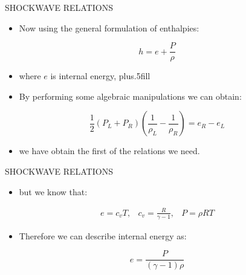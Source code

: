 \documentclass{beamer}
\begin{document}
\begin{frame}{SHOCKWAVE RELATIONS}
  \begin{itemize}
   \item Now using the general formulation of enthalpies:
  \end{itemize}  
  \begin{equation}
   h=e+\frac{P}{\rho} \nonumber
  \end{equation}
  \begin{itemize}
   \item where $e$ is internal energy,
   \vskip0pt plus.5fill
   \item By performing some algebraic manipulations we can obtain:
  \end{itemize}
  \begin{equation}
   \frac{1}{2}\left(P_L+P_R\right)\left(\frac{1}{\rho_L}-\frac{1}{\rho_R}\right)=e_R-e_L 
  \end{equation}
  \begin{itemize}
   \item we have obtain the first of the relations we need.
  \end{itemize}
\end{frame}

\begin{frame}{SHOCKWAVE RELATIONS}
  \begin{itemize}
   \item but we know that: 
  \end{itemize}
  \begin{equation}
   \begin{matrix}
    e=c_vT, & c_v=\frac{R}{\gamma-1}, & P=\rho RT 
   \end{matrix}\nonumber
  \end{equation}
  \begin{itemize}
   \item Therefore we can describe internal energy as:
  \end{itemize}
  \begin{equation}
    e=\frac{P}{(\gamma-1)\rho} \nonumber
  \end{equation}
\end{frame}
\end{document}
